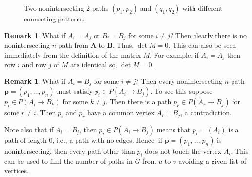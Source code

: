 \documentclass[oneside]{book}
\numberwithin{equation}{section}
\theoremstyle{definition}
\newtheorem{remark}[thm]{Remark}
\renewcommand\vec[1]{\bm{#1}}
\begin{document}
\begin{figure}
  \centering
{} \qquad 
{}
\caption{Two nonintersecting \( 2 \)-paths \( (p_1,p_2) \) and
  \( (q_1,q_2) \) with different connecting patterns.}
\label{fig:13}
\end{figure}

\begin{remark}
What if \( A_i=A_j \) or \( B_i=B_j \) for some \( i\ne j \)? Then
clearly there is no nonintersecting \( n \)-path from \( \vec A \)
to \( \vec B \). Thus, \( \det M = 0 \). This can also be seen
immediately from the definition of the matrix \( M \). For example,
if \( A_i=A_j \) then row \( i \) and row \( j \) of \( M \) are
identical so, \( \det M = 0 \).
\end{remark}

\begin{remark}
What if \( A_i=B_j \) for some \( i\ne j \)? Then every
nonintersecting \( n \)-path \( \vec p = (p_1,\dots,p_{n}) \) must
satisfy \( p_i \in P(A_i \to B_j) \). To see this suppose
\( p_i \in P(A_i \to B_k) \) for some \( k\ne j \). Then there is a
path \( p_r\in P(A_r\to B_j) \) for some \( r\ne i \). Then \( p_i \)
and \( p_r \) have a common vertex \( A_i = B_j \), a
contradiction.

Note also that if \( A_i=B_j \), then \( p_i \in P(A_i \to B_j) \)
means that \( p_i=(A_i) \) is a path of length \( 0 \), i.e., a path
with no edges. Hence, if \( \vec p = (p_1,\dots,p_{n}) \) is
nonintersecting, then every path other than \( p_i \) does not touch
the vertex \( A_i \). This can be used to find the number of paths
in \( G \) from \( u \) to \( v \) avoiding a given list of
vertices.
\end{remark}
\end{document}
